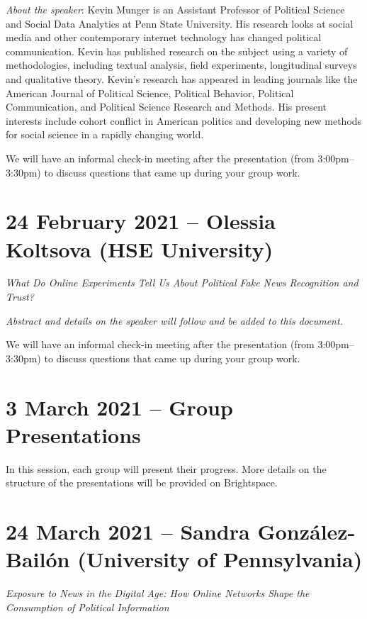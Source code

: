 \documentclass[abstract=on,parskip=full,headings=standardclasses,fontsize=11pt,paper=a4]{scrartcl}
\begin{document}
\textit{About the speaker}: Kevin Munger is an Assistant Professor of Political Science and Social Data Analytics at Penn State University. His research looks at social media and other contemporary internet technology has changed political communication. Kevin has published research on the subject using a variety of methodologies, including textual analysis, field experiments, longitudinal surveys and qualitative theory. Kevin's research has appeared in leading journals like the American Journal of Political Science, Political Behavior, Political Communication, and Political Science Research and Methods. His present interests include cohort conflict in American politics and developing new methods for social science in a rapidly changing world.
  
  
  
We will have an informal check-in meeting after the presentation (from 3:00pm--3:30pm) to discuss questions that came up during your group work.
  
  
\section{24 February 2021 -- Olessia Koltsova (HSE University)} 

\textit{What Do Online Experiments Tell Us About Political Fake News Recognition and Trust?}


\textit{Abstract and details on the speaker will follow and be added to this document.}


We will have an informal check-in meeting after the presentation (from 3:00pm--3:30pm) to discuss questions that came up during your group work.


\section{3 March 2021 -- Group Presentations}

In this session, each group will present their progress. More details on the structure of the presentations will be provided on Brightspace.



\section{24 March 2021 -- Sandra González-Bailón (University of Pennsylvania)}


 \textit{Exposure to News in the Digital Age: How Online Networks Shape the Consumption of Political Information}
 
\end{document}
